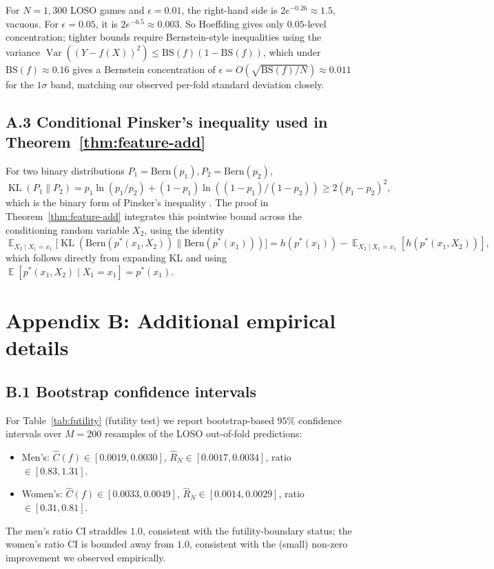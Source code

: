 \documentclass[11pt,a4paper]{article}
\theoremstyle{definition}
\DeclareMathOperator{\E}{\mathbb{E}}
\DeclareMathOperator{\Var}{Var}
\DeclareMathOperator{\KL}{KL}
\newcommand{\BS}{\mathrm{BS}}
\begin{document}
For $N = 1{,}300$ LOSO games and $\epsilon = 0.01$, the right-hand side is $2 e^{-0.26} \approx 1.5$, vacuous. For $\epsilon = 0.05$, it is $2 e^{-6.5} \approx 0.003$. So Hoeffding gives only $0.05$-level concentration; tighter bounds require Bernstein-style inequalities using the variance $\Var((Y - f(X))^2) \le \BS(f)(1 - \BS(f))$, which under $\BS(f) \approx 0.16$ gives a Bernstein concentration of $\epsilon = O(\sqrt{\BS(f)/N}) \approx 0.011$ for the $1\sigma$ band, matching our observed per-fold standard deviation closely.

\subsection*{A.3 Conditional Pinsker's inequality used in Theorem~\ref{thm:feature-add}}

For two binary distributions $P_1 = \mathrm{Bern}(p_1), P_2 = \mathrm{Bern}(p_2)$,
\[
\KL(P_1 \| P_2) = p_1 \ln(p_1 / p_2) + (1 - p_1) \ln((1 - p_1)/(1 - p_2)) \ge 2 (p_1 - p_2)^2,
\]
which is the binary form of Pinsker's inequality \citep{pinsker1964}. The proof in Theorem~\ref{thm:feature-add} integrates this pointwise bound across the conditioning random variable $X_2$, using the identity
\[
\E_{X_2 \mid X_1 = x_1}\bigl[\KL(\mathrm{Bern}(p^*(x_1, X_2)) \| \mathrm{Bern}(p^*(x_1)))\bigr] = h(p^*(x_1)) - \E_{X_2 \mid X_1 = x_1}[h(p^*(x_1, X_2))],
\]
which follows directly from expanding KL and using $\E[p^*(x_1, X_2) \mid X_1 = x_1] = p^*(x_1)$.

\section*{Appendix B: Additional empirical details}\label{app:empirical}

\subsection*{B.1 Bootstrap confidence intervals}

For Table~\ref{tab:futility} (futility test) we report bootstrap-based $95\%$ confidence intervals over $M = 200$ resamples of the LOSO out-of-fold predictions:
\begin{itemize}[leftmargin=*,itemsep=0pt]
\item Men's: $\hat{C}(f) \in [0.0019, 0.0030]$, $\hat{R}_N \in [0.0017, 0.0034]$, ratio $\in [0.83, 1.31]$.
\item Women's: $\hat{C}(f) \in [0.0033, 0.0049]$, $\hat{R}_N \in [0.0014, 0.0029]$, ratio $\in [0.31, 0.81]$.
\end{itemize}
The men's ratio CI straddles $1.0$, consistent with the futility-boundary status; the women's ratio CI is bounded away from $1.0$, consistent with the (small) non-zero improvement we observed empirically.
\end{document}
